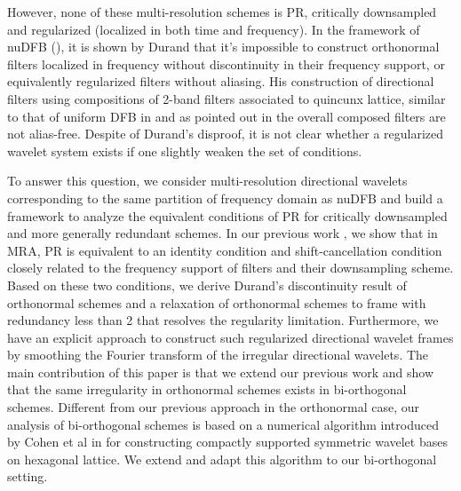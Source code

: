 However, none of these multi-resolution schemes is PR, critically downsampled and regularized (localized in both time and frequency). In the framework of nuDFB (\cite{nuDFB05}), it is shown by Durand \cite{durand2007} that it's impossible to construct orthonormal filters localized in frequency without discontinuity in their frequency support, or equivalently regularized filters without aliasing. His construction of directional filters using compositions of 2-band filters associated to quincunx lattice, similar to that of uniform DFB in \cite{nuDFB05} and as pointed out in \cite{nuDFB05} the overall composed filters are not alias-free. Despite of Durand's disproof, it is not clear whether a regularized wavelet system exists if one slightly weaken the set of conditions.

To answer this question, we consider multi-resolution directional wavelets corresponding to the same partition of frequency domain as nuDFB and build a framework to analyze the equivalent conditions of PR for critically downsampled and more generally redundant schemes. In our previous work \cite{yin2014orthshear}, we show that in MRA, PR is equivalent to an identity condition and shift-cancellation condition closely related to the frequency support of filters and their downsampling scheme. Based on these two conditions, we derive Durand's discontinuity result of orthonormal schemes and a relaxation of orthonormal schemes to frame with redundancy less than 2 that resolves the regularity limitation. Furthermore, we have an explicit approach to construct such regularized directional wavelet frames by smoothing the Fourier transform of the irregular directional wavelets.
The main contribution of this paper is that we extend our previous work and show that the same irregularity in orthonormal schemes exists in bi-orthogonal schemes. Different from our previous approach in the orthonormal case, our analysis of bi-orthogonal schemes is based on a numerical algorithm introduced by Cohen et al in \cite{cohen1993compactly} for constructing compactly supported symmetric wavelet bases on hexagonal lattice. We extend and adapt this algorithm to our bi-orthogonal setting.


